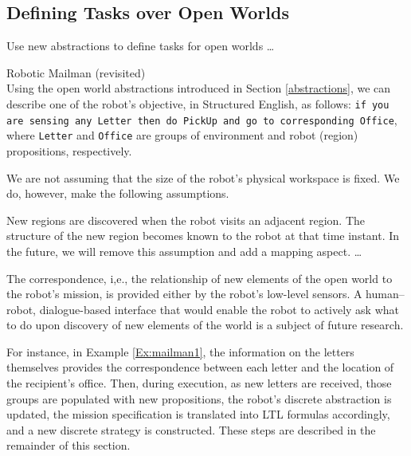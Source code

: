 \subsection{Defining Tasks over Open Worlds}

Use new abstractions to define tasks for open worlds \ldots

\begin{myExample}\label{Ex:mailman2} Robotic Mailman (revisited)\\
	Using the open world abstractions introduced in Section \ref{abstractions}, we can describe one of the robot's objective, in Structured English, as follows: 
\texttt{if you are sensing any Letter then do PickUp and go to corresponding Office}, where \texttt{Letter} and \texttt{Office} are groups of environment and robot (region) propositions, respectively.
\end{myExample}

We are not assuming that the size of the robot's physical workspace is fixed. We do, however, make the following assumptions.

\begin{myAssumption}
	New regions are discovered when the robot visits an adjacent region. The structure of the new region becomes known to the robot at that time instant. In the future, we will remove this assumption and add a mapping aspect. \ldots
\end{myAssumption}

\begin{myAssumption}
	The correspondence, i,e., the relationship of new elements of the open world to the robot's mission, is provided either by the robot's low-level sensors. A human--robot, dialogue-based interface that would enable the robot to actively ask what to do upon discovery of new elements of the world is a subject of future research.
\end{myAssumption}

For instance, in Example \ref{Ex:mailman1}, the information on the letters themselves provides the correspondence between each letter and the location of the recipient's office. Then, during execution, as new letters are received, those groups are populated with new propositions, the robot's discrete abstraction is updated, the mission specification is translated into LTL formulas accordingly, and a new discrete strategy is constructed. These steps are described in the remainder of this section.

